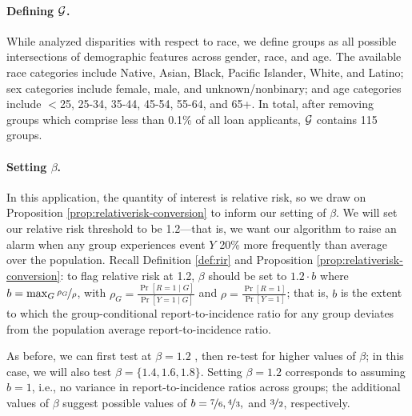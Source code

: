 \paragraph{Defining ${\mathcal{G}}$.} 
While \citet{martinez2021secret} analyzed disparities with respect to race, we define groups as all possible intersections of demographic features across gender, race, and age. 
The available race categories include Native, Asian, Black, Pacific Islander, White, and Latino; sex categories include female, male, and unknown/nonbinary; and age categories include $<$25, 25-34, 35-44, 45-54, 55-64, and 65+. 
In total, after removing groups which comprise less than 0.1\% of all loan applicants, ${\mathcal{G}}$ contains 115 groups. 

\paragraph{Setting $\beta$.}
In this application, the quantity of interest is relative risk, so we draw on Proposition \ref{prop:relativerisk-conversion} to inform our setting of $\beta$. We will set our relative risk threshold to be 1.2---that is, we want our algorithm to raise an alarm when any group experiences event $Y$ 20\% more frequently than average over the population. 
Recall Definition \ref{def:rir} and Proposition \ref{prop:relativerisk-conversion}: to flag relative risk at 1.2, $\beta$ should be set to $1.2 \cdot b$ where $b = \max_G \nicefrac{\rho_G}{\rho}$, with $\rho_G = \frac{\Pr[R =1 \mid G]}{\Pr[Y = 1 \mid G]}$ and $\rho = \frac{\Pr[R = 1]}{\Pr[Y = 1]}$; that is, $b$ is the extent to which the group-conditional report-to-incidence ratio for any group deviates from the population average report-to-incidence ratio. 

As before, we can first test at $\beta = 1.2$ , then re-test for higher values of $\beta$; in this case, we will also test $\beta = \{1.4, 1.6, 1.8\}$. Setting $\beta = 1.2$ corresponds to assuming $b = 1$, i.e., no variance in report-to-incidence ratios across groups; the additional values of $\beta$ suggest possible values of $b = \nicefrac{7}{6}, \nicefrac{4}{3},$ and $\nicefrac{3}{2}$, respectively. 

